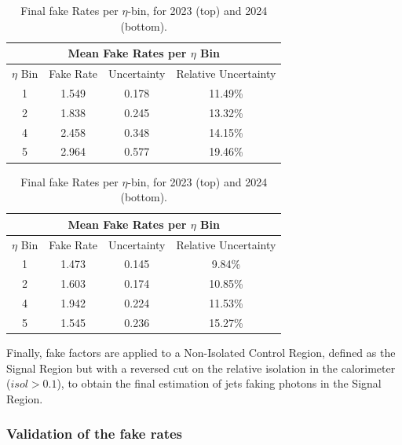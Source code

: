 \begin{minipage}[t]{\textwidth}
  \begin{table}[H]
    \caption{Fake factors computed for several Loose', for year 2023}
    \label{tab:fjy_2024_loose1}
  \end{table}
\end{minipage}

\begin{table}[!htbp]
  \centering
  \begin{tabular}{|c|c|c|c|}
    \hline
    \multicolumn{4}{|c|}{\textbf{Mean Fake Rates per $\eta$ Bin}} \\
    \hline
    $\eta$ Bin & Fake Rate & Uncertainty & Relative Uncertainty \\
    \hline
    
    1 & 1.549 & 0.178 & 11.49\% \\
    \hline
    2 & 1.838 & 0.245 & 13.32\% \\
    \hline
    4 & 2.458 & 0.348 & 14.15\% \\
    \hline
    5 & 2.964 & 0.577 & 19.46\% \\
    \hline
  \end{tabular}
  
  \begin{tabular}{|c|c|c|c|}
    \hline
    \multicolumn{4}{|c|}{\textbf{Mean Fake Rates per $\eta$ Bin}} \\
    \hline
    $\eta$ Bin & Fake Rate & Uncertainty & Relative Uncertainty \\
    \hline
    
    1 & 1.473& 0.145 & 9.84\% \\
    \hline
    2 & 1.603 & 0.174 & 10.85\% \\
    \hline
    4 & 1.942 & 0.224 & 11.53\% \\
    \hline
    5 & 1.545 & 0.236 & 15.27\% \\
    \hline
  \end{tabular}
  \caption{Final fake Rates per $\eta$-bin, for 2023 (top) and 2024 (bottom).}
  \label{tab:fjy_2023_2024}
\end{table}


Finally, fake factors are applied to a Non-Isolated Control Region, defined as the Signal Region but with a reversed cut on the relative isolation in the calorimeter ($isol>0.1$), to obtain the final estimation of jets faking photons in the Signal Region.

\subsubsection{Validation of the fake rates}


